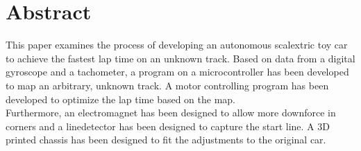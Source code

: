 \section*{Abstract}
This paper examines the process of developing an autonomous scalextric toy car to achieve the fastest lap time on an unknown track.
Based on data from a digital gyroscope and a tachometer, a program on a microcontroller has been developed to map an arbitrary, unknown track.
A motor controlling program has been developed to optimize the lap time based on the map.
\\
Furthermore, an electromagnet has been designed to allow more downforce in corners and a linedetector has been designed to capture the start line.
A 3D printed chassis has been designed to fit the adjustments to the original car.
